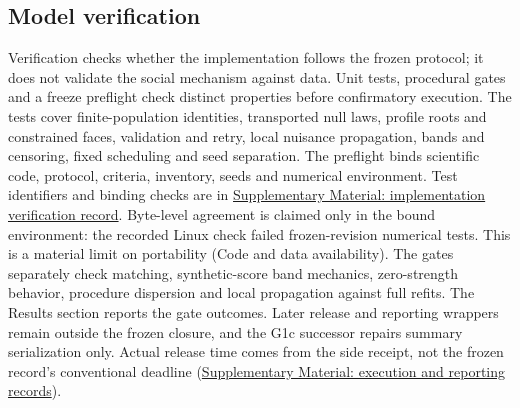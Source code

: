 \subsection{Model verification}\label{sec:verification}

Verification checks whether the implementation follows the frozen protocol; it does not validate the social mechanism against data. Unit tests, procedural gates and a freeze preflight check distinct properties before confirmatory execution. %
The tests cover finite-population identities, transported null laws, profile roots and constrained faces, validation and retry, local nuisance propagation, bands and censoring, fixed scheduling and seed separation. The preflight binds scientific code, protocol, criteria, inventory, seeds and numerical environment. Test identifiers and binding checks are in \hyperref[supp:verification-details]{Supplementary Material: implementation verification record}. %
Byte-level agreement is claimed only in the bound environment: the recorded Linux check failed frozen-revision numerical tests. This is a material limit on portability (Code and data availability). %
The gates separately check matching, synthetic-score band mechanics, zero-strength behavior, procedure dispersion and local propagation against full refits. The Results section reports the gate outcomes. Later release and reporting wrappers remain outside the frozen closure, and the G1c successor repairs summary serialization only. Actual release time comes from the side receipt, not the frozen record's conventional deadline (\hyperref[supp:execution-records]{Supplementary Material: execution and reporting records}). %

